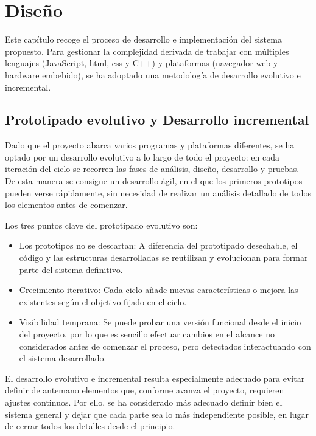 \documentclass[../main.tex]{subfiles}
\begin{document}
	\chapter{Diseño}
	\label{C:disenno}

Este capítulo recoge el proceso de desarrollo e implementación del sistema propuesto. Para gestionar la complejidad derivada de trabajar con múltiples lenguajes (JavaScript, html, css y C++) y plataformas (navegador web y hardware embebido), se ha adoptado una metodología de desarrollo evolutivo e incremental. 

\section{Prototipado evolutivo y Desarrollo incremental}
\label{sec:desarrollo-incremental}

Dado que el proyecto abarca varios programas y plataformas diferentes, se ha optado por un desarrollo evolutivo a lo largo de todo el proyecto: en cada iteración del ciclo se recorren las fases de análisis, diseño, desarrollo y pruebas. De esta manera se consigue un desarrollo ágil, en el que los primeros prototipos pueden verse rápidamente, sin necesidad de realizar un análisis detallado de todos los elementos antes de comenzar.

Los tres puntos clave del prototipado evolutivo son:
\begin{itemize}
	\item Los prototipos no se descartan: A diferencia del prototipado desechable, el código y las estructuras desarrolladas se reutilizan y evolucionan para formar parte del sistema definitivo.

	\item Crecimiento iterativo: Cada ciclo añade nuevas características o mejora las existentes según el objetivo fijado en el ciclo.

	\item Visibilidad temprana: Se puede probar una versión funcional desde el inicio del proyecto, por lo que es sencillo efectuar cambios en el alcance no considerados antes de comenzar el proceso, pero detectados interactuando con el sistema desarrollado.
\end{itemize}

El desarrollo evolutivo e incremental resulta especialmente adecuado para evitar definir de antemano elementos que, conforme avanza el proyecto, requieren ajustes continuos. Por ello, se ha considerado más adecuado definir bien el sistema general y dejar que cada parte sea lo más independiente posible, en lugar de cerrar todos los detalles desde el principio.
\end{document}
